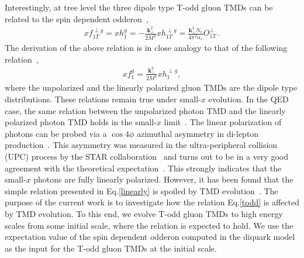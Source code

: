 \documentclass[prd,aps,preprintnumbers,fleqn,showpacs,nofootinbib,superscriptaddress]{revtex4}
\begin{document}
Interestingly, at tree level the three dipole type T-odd gluon TMDs can be related to the spin dependent odderon~\cite{Boer:2015pni,Kovchegov:2021iyc,Boer:2016xqr},
 \begin{eqnarray}
  x f_{1T}^{\perp g}
  = x h_1^g
  = - \frac{\bm{k}_\perp^2}{2M^2} x h_{1T}^{\perp g} 
  =\frac{\bm{k}_\perp^2 N_c}{4 \pi^2 \alpha_s  }O_{1T}^\perp
 \label{todd} \,.
\end{eqnarray}
 The derivation of the above relation is in close analogy to that of the following  relation~\cite{Metz:2011wb,Dominguez:2011br},
 \begin{eqnarray}
x f_1^g = \frac{\bm{k}_\perp^2}{2M^2} x h_1^{\perp g},
\label{linearly}
\end{eqnarray}
where the unpolarized and the linearly polarized gluon TMDs are the dipole type distributions. These relations remain true under small-$x$ evolution. In the QED case, the same relation between the unpolarized photon TMD and the linearly polarized photon TMD  holds  in the small-$x$ limit~\cite{Li:2019sin,Li:2019yzy,Sun:2020ygb}. The linear polarization of photons can be probed via a $\cos 4\phi$ azimuthal asymmetry in di-lepton production~\cite{Pisano:2013cya}. This asymmetry was measured in the ultra-peripheral collision (UPC) process by the STAR collaboration~\cite{Adam:2019mby} and turns out to be in a very good agreement with the theoretical expectation~\cite{Li:2019sin,Li:2019yzy}. This strongly indicates that the small-$x$ photons are fully linearly polarized. However, it has been found that the simple relation presented in Eq.\ref{linearly} is spoiled by TMD evolution~\cite{Boer:2017xpy}.    The purpose of the current work is to investigate how the relation Eq.\ref{todd} is affected by TMD evolution. To this end, we evolve T-odd gluon TMDs to high energy scales from some initial scale, where the relation  is expected to hold.  We use the expectation value of the spin dependent odderon computed in the diquark model~\cite{Szymanowski:2016mbq} as the input for the  T-odd gluon TMDs at the initial scale.
\end{document}
